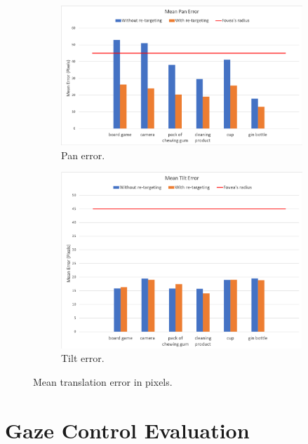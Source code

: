 \documentclass{l4proj}
\begin{document}
\begin{figure}[H]
  \centering
  \begin{subfigure}[b]{0.8\textwidth}
    \includegraphics[width=\textwidth]{l4template-master/mean_pan_error.png}
    \caption{Pan error.}
    \label{panerror}
  \end{subfigure}
  
  \begin{subfigure}[b]{0.8\textwidth}
    \includegraphics[width=\textwidth]{l4template-master/mean_tilt_error.png}
    \caption{Tilt error.}
    \label{tilterror}
  \end{subfigure}
  
  

\caption{Mean translation error in pixels.}
\label{meanerror}
\end{figure}
\section{Gaze Control Evaluation}
\end{document}
